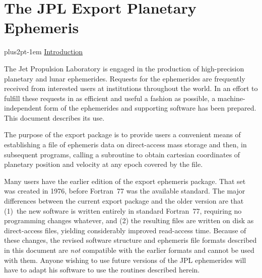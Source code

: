 \documentclass[twoside,11pt,nolof]{starlink}
\providecommand{\hdg}[1]{\vskip4pt plus2pt\leavevmode\kern-1em \underline{\large{#1}}\par}
\begin{document}



\section*{The JPL Export Planetary Ephemeris}

\hdg{Introduction}

The Jet Propulsion Laboratory is engaged in the production of
high-precision planetary and lunar ephemerides. Requests
for the ephemerides are frequently received
from interested users at institutions throughout the world.
In an effort to fulfill these requests in as efficient and
useful a fashion as possible, a machine-independent form of the
ephemerides and supporting software has been prepared.
This document describes its use.

The purpose of the export package is to provide users a convenient
means of establishing a file of ephemeris data on direct-access
mass storage and then, in subsequent programs,
calling a subroutine to obtain cartesian
coordinates of planetary position and velocity at any epoch covered
by the file.

Many users have the earlier edition of the export ephemeris
package. That set was created in 1976, before Fortran~77 was
the available standard.
The major differences between the current export package and
the older version are that (1)~the new software is
written entirely in standard Fortran~77, requiring no programming changes
whatever, and (2) the resulting files are written on disk as
direct-access files, yielding considerably improved read-access time.
Because of these changes,
the revised software structure and ephemeris
file formats described in this document are \textit{not\/} compatible
with the earlier formats and cannot be used with them.
Anyone wishing to use future versions of the JPL ephemerides
will have to adapt his software to use the routines described
herein.
\end{document}
